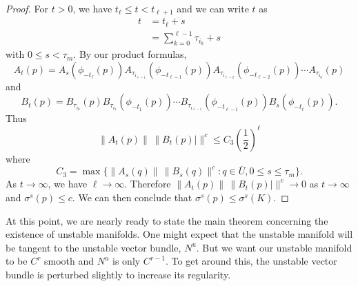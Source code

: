 \begin{proof}
	For \(t> 0\), we have \(t_\ell\leq t < t_{\ell+1}\) and we can write \(t\) as
	\begin{equation}
		\begin{aligned}
			t &= t_\ell + s \\
			&= \sum_{k=0}^{\ell - 1} \tau_{i_k} +s 
		\end{aligned}
	\end{equation}
	with \(0\leq s <\tau_m.\) By our product formulas,
	\begin{equation}
		A_t(p) = A_s( \phi_{-t_\ell}(p) ) A_{\tau_{i_{\ell-1}}}(\phi_{-t_{\ell-1}}(p)) A_{\tau_{i_{\ell-2}}}(\phi_{-t_{\ell-2}}(p)) \cdots A_{\tau_{i_0}}(p)
	\end{equation}
	and 
	\begin{equation}
		B_t(p) = B_{\tau_{i_0}}(p) B_{\tau_{i_1}}(\phi_{-t_1}(p)) \cdots B_{\tau_{i_{\ell-1}}}(\phi_{-t_{\ell-1}}(p)) B_s(\phi_{-t_\ell}(p)).
	\end{equation}
	Thus
	\begin{equation}
		\| A_t(p) \| \, \| B_t(p)| \|^c \leq C_3 \left( \frac 1 2 \right)^\ell
	\end{equation}
	where 
	\begin{equation}
		C_3 = \max\{ \| A_s(q) \| \, \| B_s(q) \|^c : q\in \overline U, 0 \leq s \leq \tau_m\}.
	\end{equation}
	As \(t\to\infty\), we have \(\ell \to \infty\). Therefore \( \| A_t(p) \| \, \| B_t(p)| \|^c\to 0\) as \(t\to\infty\) and \(\sigma^s(p) \leq c\). We can then conclude that \(\sigma^s(p) \leq \sigma^s(K).\)
\end{proof}

At this point, we are nearly ready to state the main theorem concerning the existence of unstable manifolds. One might expect that the unstable manifold will be tangent to the unstable vector bundle, \(N^u\). But we want our unstable manifold to be \(C^r\) smooth and \(N^u\) is only \(C^{r-1}\). To get around this, the unstable vector bundle is perturbed slightly to increase its regularity. 

